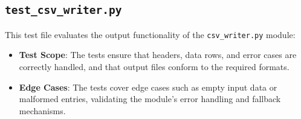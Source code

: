 \documentclass[conference]{IEEEtran}
\begin{document}
\subsection{\textbf{\texttt{test\_csv\_writer.py}}}
This test file evaluates the output functionality of the \texttt{csv\_writer.py} module:
\begin{itemize}
      \item \textbf{Test Scope}: The tests ensure that headers, data rows, and error cases are correctly handled, and that output files conform to the required formats.
      \item \textbf{Edge Cases}: The tests cover edge cases such as empty input data or malformed entries, validating the module's error handling and fallback mechanisms.
\end{itemize}
\end{document}

